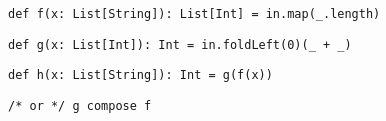 \documentclass[include/preamble.tex]{subfiles}
\begin{document}
\begin{frame}[fragile]
  \begin{center}
    \newline
    \newline
    \begin{flushleft}

      \begin{lrbox}{\boxA}
        \begin{lstlisting}[style=scala]
def f(x: List[String]): List[Int] = in.map(_.length)
        \end{lstlisting}
      \end{lrbox}

      \begin{lrbox}{\boxB}
        \begin{lstlisting}[style=scala]
def g(x: List[Int]): Int = in.foldLeft(0)(_ + _)
        \end{lstlisting}
      \end{lrbox}

      \begin{lrbox}{\boxC}
        \begin{lstlisting}[style=scala]
def h(x: List[String]): Int = g(f(x))
        \end{lstlisting}
      \end{lrbox}

      \begin{lrbox}{\boxD}
        \begin{lstlisting}[style=scala]
                     /* or */ g compose f
        \end{lstlisting}
      \end{lrbox}

      \newline
      \newline
      \newline
      \newline
    \end{flushleft}
  \end{center}
\end{frame}
\end{document}
